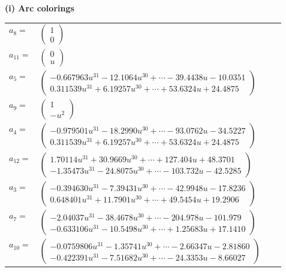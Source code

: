 \documentclass[1p]{elsarticle_modified}
\theoremstyle{definition}
\begin{document}
\flushleft \textbf{(i) Arc colorings}\\
\begin{tabular}{m{7pt} m{180pt} m{7pt} m{180pt} }
\flushright $a_{8}=$&$\begin{pmatrix}1\\0\end{pmatrix}$ \\
\flushright $a_{11}=$&$\begin{pmatrix}0\\u\end{pmatrix}$ \\
\flushright $a_{5}=$&$\begin{pmatrix}-0.667963 u^{31}-12.1064 u^{30}+\cdots-39.4438 u-10.0351\\0.311539 u^{31}+6.19257 u^{30}+\cdots+53.6324 u+24.4875\end{pmatrix}$ \\
\flushright $a_{9}=$&$\begin{pmatrix}1\\- u^2\end{pmatrix}$ \\
\flushright $a_{4}=$&$\begin{pmatrix}-0.979501 u^{31}-18.2990 u^{30}+\cdots-93.0762 u-34.5227\\0.311539 u^{31}+6.19257 u^{30}+\cdots+53.6324 u+24.4875\end{pmatrix}$ \\
\flushright $a_{12}=$&$\begin{pmatrix}1.70114 u^{31}+30.9669 u^{30}+\cdots+127.404 u+48.3701\\-1.35473 u^{31}-24.8075 u^{30}+\cdots-103.732 u-42.5285\end{pmatrix}$ \\
\flushright $a_{3}=$&$\begin{pmatrix}-0.394630 u^{31}-7.39431 u^{30}+\cdots-42.9948 u-17.8236\\0.648401 u^{31}+11.7901 u^{30}+\cdots+49.5454 u+19.2906\end{pmatrix}$ \\
\flushright $a_{7}=$&$\begin{pmatrix}-2.04037 u^{31}-38.4678 u^{30}+\cdots-204.978 u-101.979\\-0.633106 u^{31}-10.5498 u^{30}+\cdots+1.25683 u+17.1410\end{pmatrix}$ \\
\flushright $a_{10}=$&$\begin{pmatrix}-0.0759806 u^{31}-1.35741 u^{30}+\cdots-2.66347 u-2.81860\\-0.422391 u^{31}-7.51682 u^{30}+\cdots-24.3353 u-8.66027\end{pmatrix}$ \\

\end{tabular}
\end{document}
